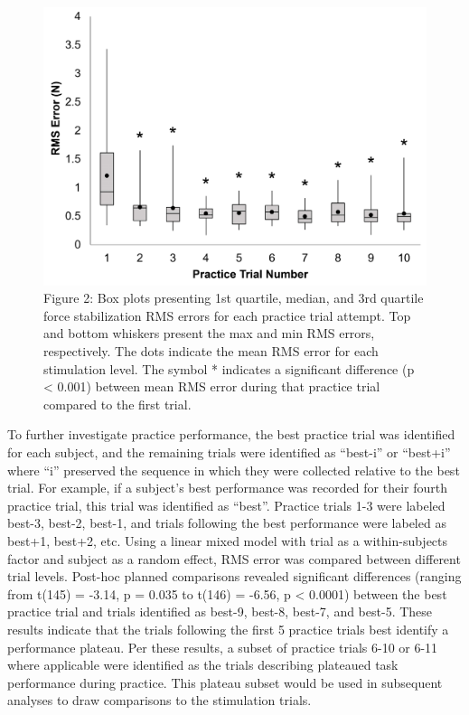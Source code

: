 \documentclass[]{cik}%
\begin{document}
\begin{figure}

{\centering \includegraphics[width=1\textwidth,height=\textheight]{./figures/fig2.pdf}

}

\caption{\label{fig-2}Figure 2: Box plots presenting 1st quartile,
median, and 3rd quartile force stabilization RMS errors for each
practice trial attempt. Top and bottom whiskers present the max and min
RMS errors, respectively. The dots indicate the mean RMS error for each
stimulation level. The symbol * indicates a significant difference (p
\textless{} 0.001) between mean RMS error during that practice trial
compared to the first trial.}

\end{figure}

To further investigate practice performance, the best practice trial was
identified for each subject, and the remaining trials were identified as
``best-i'' or ``best+i'' where ``i'' preserved the sequence in which
they were collected relative to the best trial. For example, if a
subject's best performance was recorded for their fourth practice trial,
this trial was identified as ``best''. Practice trials 1-3 were labeled
best-3, best-2, best-1, and trials following the best performance were
labeled as best+1, best+2, etc. Using a linear mixed model with trial as
a within-subjects factor and subject as a random effect, RMS error was
compared between different trial levels. Post-hoc planned comparisons
revealed significant differences (ranging from t(145) = -3.14, p = 0.035
to t(146) = -6.56, p \textless{} 0.0001) between the best practice trial
and trials identified as best-9, best-8, best-7, and best-5. These
results indicate that the trials following the first 5 practice trials
best identify a performance plateau. Per these results, a subset of
practice trials 6-10 or 6-11 where applicable were identified as the
trials describing plateaued task performance during practice. This
plateau subset would be used in subsequent analyses to draw comparisons
to the stimulation trials.
\end{document}
